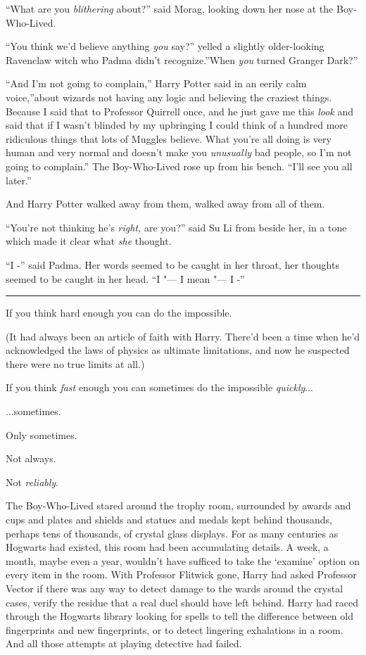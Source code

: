 ``What are you \emph{blithering} about?'' said Morag, looking down her
nose at the Boy-Who-Lived.

``You think we'd believe anything \emph{you} say?'' yelled a slightly
older-looking Ravenclaw witch who Padma didn't recognize.''When
\emph{you} turned Granger Dark?''

``And I'm not going to complain,'' Harry Potter said in an eerily calm
voice,''about wizards not having any logic and believing the craziest
things. Because I said that to Professor Quirrell once, and he just gave
me this \emph{look} and said that if I wasn't blinded by my upbringing I
could think of a hundred more ridiculous things that lots of Muggles
believe. What you're all doing is very human and very normal and doesn't
make you \emph{unusually} bad people, so I'm not going to complain.''
The Boy-Who-Lived rose up from his bench. ``I'll see you all later.''

And Harry Potter walked away from them, walked away from all of them.

``You're not thinking he's \emph{right,} are you?'' said Su Li from
beside her, in a tone which made it clear what \emph{she} thought.

``I -'' said Padma. Her words seemed to be caught in her throat, her
thoughts seemed to be caught in her head. ``I "--- I mean "--- I -''

\begin{center}\rule{3in}{0.4pt}\end{center}

If you think hard enough you can do the impossible.

(It had always been an article of faith with Harry. There'd been a time
when he'd acknowledged the laws of physics as ultimate limitations, and
now he suspected there were no true limits at all.)

If you think \emph{fast} enough you can sometimes do the impossible
\emph{quickly}...

...sometimes.

Only sometimes.

Not always.

Not \emph{reliably}.

The Boy-Who-Lived stared around the trophy room, surrounded by awards
and cups and plates and shields and statues and medals kept behind
thousands, perhaps tens of thousands, of crystal glass displays. For as
many centuries as Hogwarts had existed, this room had been accumulating
details. A week, a month, maybe even a year, wouldn't have sufficed to
take the `examine' option on every item in the room. With Professor
Flitwick gone, Harry had asked Professor Vector if there was any way to
detect damage to the wards around the crystal cases, verify the residue
that a real duel should have left behind. Harry had raced through the
Hogwarts library looking for spells to tell the difference between old
fingerprints and new fingerprints, or to detect lingering exhalations in
a room. And all those attempts at playing detective had failed.

